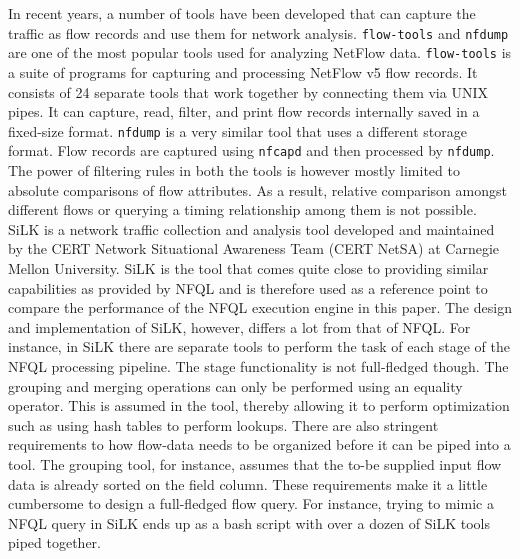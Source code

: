 
In recent years, a number of tools have been developed that can capture the
traffic as flow records and use them for network analysis. \texttt{flow-tools}
and \texttt{nfdump} are one of the most popular tools used for analyzing
NetFlow data. \texttt{flow-tools} \cite{sromig:2000} is a suite of programs
for capturing and processing NetFlow v5 flow records. It consists of 24
separate tools that work together by connecting them via UNIX pipes. It can
capture, read, filter, and print flow records internally saved in a fixed-size
format. \texttt{nfdump} \cite{phaag:2006} is a very similar tool that uses a
different storage format. Flow records are captured using \texttt{nfcapd} and
then processed by \texttt{nfdump}. The power of filtering rules in both the
tools is however mostly limited to absolute comparisons of flow attributes. As
a result, relative comparison amongst different flows or querying a timing
relationship among them is not possible.  SiLK \cite{SiLK} is a network
traffic collection and analysis tool developed and maintained by the CERT
Network Situational Awareness Team (CERT NetSA) at Carnegie Mellon University.
SiLK is the tool that comes quite close to providing similar capabilities as
provided by \ac{NFQL} and is therefore used as a reference point to compare
the performance of the \ac{NFQL} execution engine in this paper. The design
and implementation of SiLK, however, differs a lot from that of \ac{NFQL}. For
instance, in SiLK there are separate tools to perform the task of each stage
of the \ac{NFQL} processing pipeline. The stage functionality is not
full-fledged though. The grouping and merging operations can only be performed
using an equality operator. This is assumed in the tool, thereby allowing it
to perform optimization such as using hash tables to perform lookups. There
are also stringent requirements to how flow-data needs to be organized before
it can be piped into a tool. The grouping tool, for instance, assumes that the
to-be supplied input flow data is already sorted on the field column.  These
requirements make it a little cumbersome to design a full-fledged flow query.
For instance, trying to mimic a \ac{NFQL} query in SiLK ends up as a bash
script with over a dozen of SiLK tools piped together.
